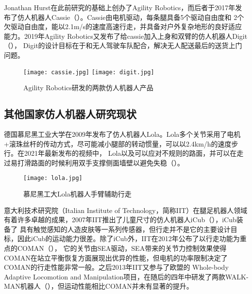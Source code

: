 Jonathan Hurst在此前研究的基础上创办了Agility Robotics，而后者于2017年发布了仿人机器人Cassie\cite{Cassie}（）。Cassie由电机驱动，每条腿具备5个驱动自由度和
2个欠驱动自由度，能以2.1m/s的速度高速行走，并具备对户外复杂地形的良好适应能力。2019年Agility Robotics又发布了给cassie加入上身和双臂的仿人机器人Digit\cite{Digit}（），
Digit的设计目标在于和无人驾驶车队配合，解决无人配送最后的送货上门问题。
\begin{figure}[htbp]
    \centering
        {%
            \texttt{[image: cassie.jpg]}}
    \hspace{1in}            
        {%
            \texttt{[image: digit.jpg]}}
    \caption{Agility Robotics研发的两款仿人机器人产品\label{fig:michigan_biped}}
\end{figure}
\subsection{其他国家仿人机器人研究现状}

德国慕尼黑工业大学在2009年发布了仿人机器人Lola\cite{buschmann2009humanoid}。Lola多个关节采用了电机+滚珠丝杆的传动方式，尽可能减小腿部的转动惯量，可以以2.4km/h的速度步行。在2021年最新发布的视频中，
Lola以及可以应对不规则的路面，并可以在走过易打滑路面的时候利用双手支撑侧面墙壁以避免失稳\cite{Lola}（）。

\begin{figure}[htbp]
    \centering
    \texttt{[image: lola.jpg]}
    \caption{\label{fig:lola}慕尼黑工大Lola机器人手臂辅助行走}
\end{figure}
意大利技术研究院（Italian Institute of Technology，简称IIT）在腿足机器人领域有着许多卓越的成果，2007年IIT推出了儿童尺寸的仿人机器人iCub\cite{tsagarakis2007icub}（），iCub装备了
具有触觉感知的人造皮肤等一系列传感器，但行走并不是它的主要设计目标，因此iCub的运动能力很差。除了iCub外，IIT在2012年公布了以行走功能为重点的COMAN\cite{dallali2012global}（），
它的关节由SEA驱动，SEA带来的关节力控制效果使得COMAN在站立平衡恢复方面展现出优异的性能，但电机的功率限制决定了COMAN的行走性能非常一般。之后2013年IIT又参与了欧盟的
Whole-body Adaptive Locomotion and Manipulation项目，在随后的四年中研发了两款WALK-MAN机器人\cite{tsagarakis2017walk}（），但运动性能相比COMAN并未有显著的提升。

